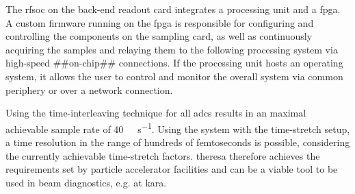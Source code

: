The \gls{rfsoc} on the back-end readout card integrates a processing unit and a \gls{fpga}. 
A custom firmware running on the \gls{fpga} is responsible for configuring and controlling the components on the sampling card, as well as continuously acquiring the samples and relaying them to the following processing system via high-speed ##on-chip## connections. %
If the processing unit hosts an operating system, it allows the user to control and monitor the overall system via common periphery or over a network connection.

Using the time-interleaving technique for all \glspl{adc} results in an maximal achievable sample rate of \SI{40}{\giga \sample \per \second}.  %
Using the system with the time-stretch setup, a time resolution in the range of hundreds of femtoseconds is possible, considering the currently achievable time-stretch factors.
\gls{theresa} therefore achieves the requirements set by particle accelerator facilities and can be a viable tool to be used in beam diagnostics, e.g. at \gls{kara}.
